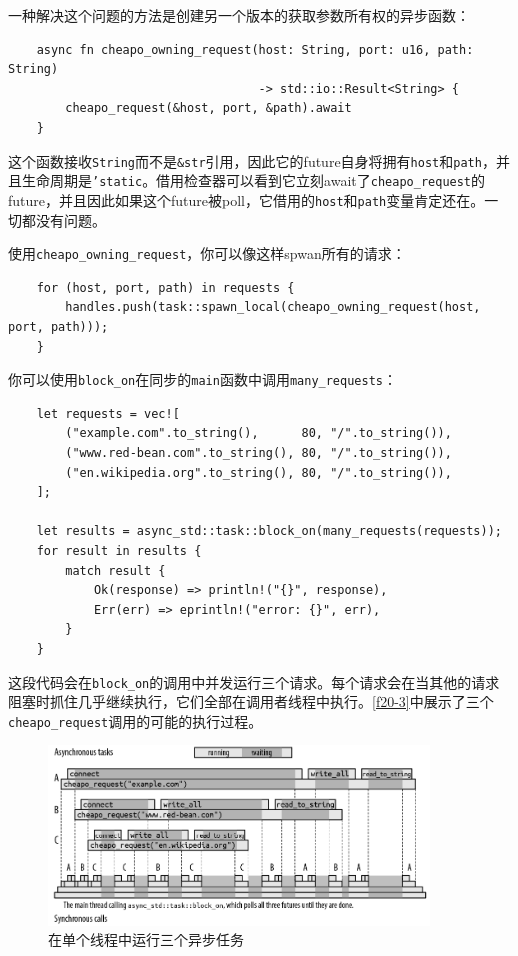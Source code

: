 一种解决这个问题的方法是创建另一个版本的获取参数所有权的异步函数：
\begin{verbatim}
    async fn cheapo_owning_request(host: String, port: u16, path: String)
                                   -> std::io::Result<String> {
        cheapo_request(&host, port, &path).await
    }
\end{verbatim}

这个函数接收\texttt{String}而不是\texttt{\&str}引用，因此它的future自身将拥有\texttt{host}和\texttt{path}，并且生命周期是\texttt{'static}。借用检查器可以看到它立刻await了\texttt{cheapo\_request}的future，并且因此如果这个future被poll，它借用的\texttt{host}和\texttt{path}变量肯定还在。一切都没有问题。

使用\texttt{cheapo\_owning\_request}，你可以像这样spwan所有的请求：
\begin{verbatim}
    for (host, port, path) in requests {
        handles.push(task::spawn_local(cheapo_owning_request(host, port, path)));
    }
\end{verbatim}

你可以使用\texttt{block\_on}在同步的\texttt{main}函数中调用\texttt{many\_requests}：
\begin{verbatim}
    let requests = vec![
        ("example.com".to_string(),      80, "/".to_string()),
        ("www.red-bean.com".to_string(), 80, "/".to_string()),
        ("en.wikipedia.org".to_string(), 80, "/".to_string()),
    ];

    let results = async_std::task::block_on(many_requests(requests));
    for result in results {
        match result {
            Ok(response) => println!("{}", response),
            Err(err) => eprintln!("error: {}", err),
        }
    }
\end{verbatim}

这段代码会在\texttt{block\_on}的调用中并发运行三个请求。每个请求会在当其他的请求阻塞时抓住几乎继续执行，它们全部在调用者线程中执行。\autoref{f20-3}中展示了三个\texttt{cheapo\_request}调用的可能的执行过程。

\begin{figure}[htbp]
    \centering
    \includegraphics[width=0.9\textwidth]{../img/f20-3.png}
    \caption{在单个线程中运行三个异步任务}
    \label{f20-3}
\end{figure}

